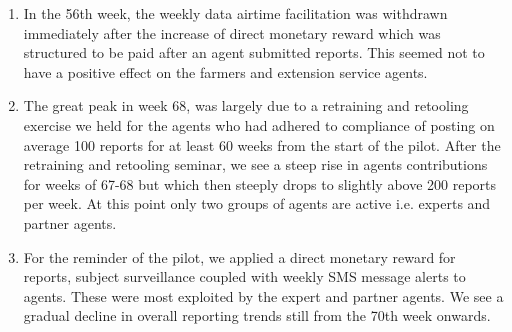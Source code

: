 \documentclass[letterpaper]{article} %
\begin{document}
\begin{enumerate}[-]
\item In the 56th week, the weekly data airtime facilitation was withdrawn immediately after the increase of direct monetary reward which was structured to be paid after an agent submitted reports. This seemed not to have a positive effect on the farmers and extension service agents.
\item The great peak in week 68, was largely due to a retraining and retooling exercise we held for the agents who had adhered to compliance of posting on average 100 reports for at least 60 weeks from the start of the pilot. After the retraining and retooling seminar, we see a steep rise in agents contributions for weeks of 67-68 but which then steeply drops to slightly above 200 reports per week. At this point only two groups of agents are active i.e. experts and partner agents.
\item For the reminder of the pilot, we applied a direct monetary reward for reports, subject surveillance coupled with weekly SMS message alerts to agents. These were most exploited by the expert and partner agents. We see a gradual decline in overall reporting trends still from the 70th week onwards.
\end{enumerate}
\end{document}
